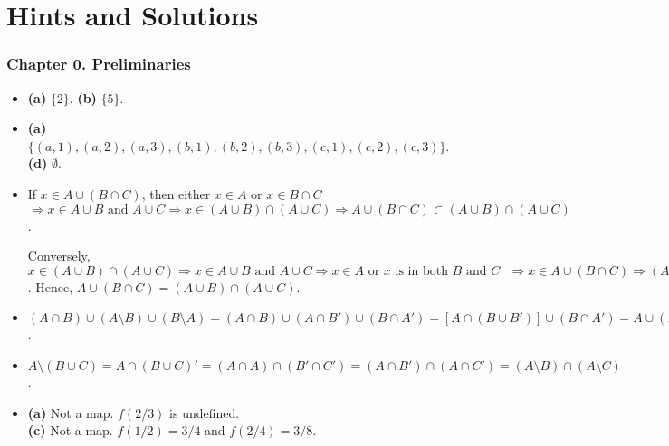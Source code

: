 \chapter*{Hints and Solutions}
 
 
\pagestyle{myheadings}
 
 
 
\subsection*{Chapter 0. Preliminaries}
 
 
{\small
\begin{itemize}
 
\bf\item[1.]\rm
{\bf (a)} $\{ 2 \}$.
{\bf (b)} $\{ 5 \}$.
 
\bf\item[2.]\rm
{\bf (a)} $\{ (a,1), (a,2), (a,3), (b,1), (b,2), (b,3), (c,1), (c,2),
(c,3) \}$. \\
{\bf (d)} $\emptyset$.
 
\bf\item[6.]\rm
If $x \in A \cup (B \cap C)$, then either $x \in A$ or $x \in B \cap 
C$  $\Rightarrow x \in A \cup B \mbox{ and } A \cup C \Rightarrow x 
\in (A \cup B) \cap (A \cup C) \Rightarrow  A \cup (B \cap C) \subset 
(A \cup B) \cap (A \cup C)$. 
 
Conversely, $x \in (A \cup B) \cap (A \cup C) \Rightarrow  x \in A 
\cup B \mbox{ and } A \cup C \Rightarrow x \in A \mbox{ or $x$ is in
both $B$ and $C$ } \Rightarrow x \in A \cup (B \cap C) \Rightarrow
(A \cup B) \cap (A \cup C) \subset A \cup (B \cap C)$. Hence, $A \cup 
(B \cap C) = (A \cup B) \cap (A \cup C)$. 
 
\bf\item[10.]\rm
$(A \cap B) \cup (A \setminus B) \cup (B \setminus A) = (A \cap B) \cup 
(A \cap B') \cup (B \cap A') = [A \cap (B \cup B')] \cup (B \cap A')
= A \cup (B \cap A') = (A \cup B) \cap (A \cup A') = A \cup B$.
 
 
\bf\item[14.]\rm
$A \setminus (B \cup C) = A \cap (B \cup C)'
= (A \cap A) \cap (B' \cap C')
= (A \cap B') \cap (A \cap C') = 
(A \setminus B) \cap (A \setminus C)$. 
 
\bf\item[17.]\rm
{\bf (a)} Not a map. $f(2/3)$ is undefined. \\
{\bf (c)} Not a map. $f(1/2) =3/4$ and $f(2/4)=3/8$.
 

\end{itemize}}
